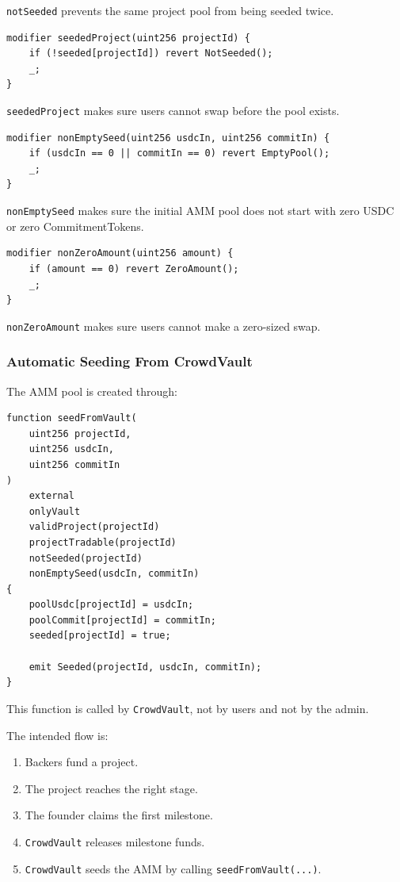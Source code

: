 \documentclass[11pt,a4paper]{article}
\begin{document}
\texttt{notSeeded} prevents the same project pool from being seeded twice.

\begin{lstlisting}
modifier seededProject(uint256 projectId) {
    if (!seeded[projectId]) revert NotSeeded();
    _;
}
\end{lstlisting}

\texttt{seededProject} makes sure users cannot swap before the pool exists.

\begin{lstlisting}
modifier nonEmptySeed(uint256 usdcIn, uint256 commitIn) {
    if (usdcIn == 0 || commitIn == 0) revert EmptyPool();
    _;
}
\end{lstlisting}

\texttt{nonEmptySeed} makes sure the initial AMM pool does not start with zero USDC or zero CommitmentTokens.

\begin{lstlisting}
modifier nonZeroAmount(uint256 amount) {
    if (amount == 0) revert ZeroAmount();
    _;
}
\end{lstlisting}

\texttt{nonZeroAmount} makes sure users cannot make a zero-sized swap.

\subsubsection{Automatic Seeding From CrowdVault}

The AMM pool is created through:

\begin{lstlisting}
function seedFromVault(
    uint256 projectId,
    uint256 usdcIn,
    uint256 commitIn
)
    external
    onlyVault
    validProject(projectId)
    projectTradable(projectId)
    notSeeded(projectId)
    nonEmptySeed(usdcIn, commitIn)
{
    poolUsdc[projectId] = usdcIn;
    poolCommit[projectId] = commitIn;
    seeded[projectId] = true;

    emit Seeded(projectId, usdcIn, commitIn);
}
\end{lstlisting}

This function is called by \texttt{CrowdVault}, not by users and not by the admin.

The intended flow is:

\begin{enumerate}
  \item Backers fund a project.
  \item The project reaches the right stage.
  \item The founder claims the first milestone.
  \item \texttt{CrowdVault} releases milestone funds.
  \item \texttt{CrowdVault} seeds the AMM by calling \texttt{seedFromVault(...)}.
\end{enumerate}
\end{document}
